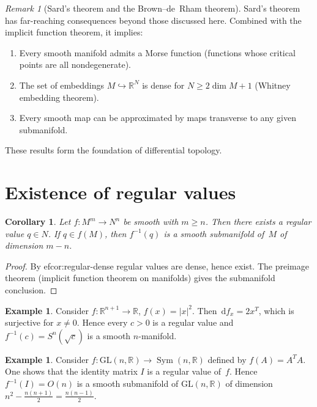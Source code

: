 \documentclass[12pt,a4paper,openany]{book}
\newtheorem{corollary}[theorem]{Corollary}
\theoremstyle{definition}
\newtheorem{example}[theorem]{Example}
\theoremstyle{remark}
\newtheorem{remark}[theorem]{Remark}
\newcommand{\R}{\mathbb{R}}
\newcommand{\GL}{\mathrm{GL}}
\newcommand{\dd}{\,\mathrm{d}}
\newcommand{\abs}[1]{\left\lvert #1 \right\rvert}
\begin{document}
\begin{remark}[Sard's theorem and the Brown--de~Rham theorem]
  \label{rem:sard-brown}
Sard's theorem has far-reaching consequences beyond those discussed here.
Combined with the implicit function theorem, it implies:
\begin{enumerate}[label=(\roman*)]
  \item Every smooth manifold admits a Morse function (functions whose
    critical points are all nondegenerate).
  \item The set of embeddings $M\hookrightarrow\R^N$ is dense for
    $N\ge 2\dim M + 1$ (Whitney embedding theorem).
  \item Every smooth map can be approximated by maps transverse to any
    given submanifold.
\end{enumerate}
These results form the foundation of differential topology.
\end{remark}

\section{Existence of regular values}\label{sec:existence-regular}

\begin{corollary}\label{cor:existence-regular}
Let $f\colon M^m\to N^n$ be smooth with $m\ge n$.  Then there exists
a regular value $q\in N$.  If $q\in f(M)$, then $f^{-1}(q)$ is a
smooth submanifold of~$M$ of dimension $m - n$.
\end{corollary}

\begin{proof}
By 
ef{cor:regular-dense} regular values are dense, hence exist.
The preimage theorem (implicit function theorem on manifolds) gives
the submanifold conclusion.
\end{proof}

\begin{example}\label{ex:regular-value-sphere}
Consider $f\colon\R^{n+1}\to\R$, $f(x) = \abs{x}^2$.  Then
$\dd f_x = 2x^T$, which is surjective for $x\ne 0$.  Hence every
$c > 0$ is a regular value and $f^{-1}(c) = S^n(\sqrt{c})$ is a
smooth $n$-manifold.
\end{example}

\begin{example}\label{ex:regular-value-matrix}
Consider $f\colon\GL(n,\R)\to\operatorname{Sym}(n,\R)$ defined by
$f(A) = A^TA$.  One shows that the identity matrix $I$ is a regular
value of~$f$.  Hence $f^{-1}(I) = O(n)$ is a smooth submanifold of
$\GL(n,\R)$ of dimension $n^2 - \frac{n(n+1)}{2} = \frac{n(n-1)}{2}$.
\end{example}
\end{document}
